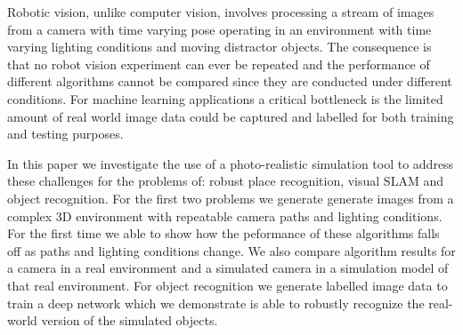 
Robotic vision, unlike computer vision, involves processing a stream of images from a camera with time varying pose operating in an environment with
time varying lighting conditions and moving distractor objects.
The consequence is that no robot vision experiment can ever be repeated and the performance of different algorithms cannot be compared since they are conducted under different conditions.
For machine learning applications a critical bottleneck is the limited amount of real world image data could be captured and labelled for both training and testing purposes. 

In this paper we investigate the use of a photo-realistic  simulation tool to address these challenges for the problems of: robust place recognition,
visual SLAM and object recognition.
For the first two problems we generate generate images from a complex 3D environment with
repeatable camera paths and lighting conditions.
For the first time we able to show how the peformance of these algorithms falls off as paths  and lighting conditions change.
We also compare algorithm results for a camera in a  real environment and a simulated camera in a simulation model of that real environment.
For object recognition we generate labelled image data to train a deep network which we demonstrate is able to robustly recognize the real-world
version of the simulated objects.

%
